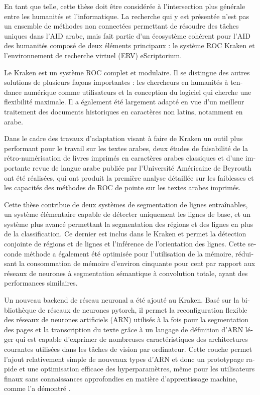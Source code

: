 \begin{french}
En tant que telle, cette thèse doit être considérée à l'intersection plus
générale entre les humanités et l'informatique. La recherche qui y est
présentée n'est pas un ensemble de méthodes non connectées permettant de
résoudre des tâches uniques dans l'AID arabe, mais fait partie d'un écosystème
cohérent pour l'AID des humanités composé de deux éléments principaux :
le système ROC Kraken et l'environnement de recherche virtuel (ERV)
eScriptorium.

Le Kraken est un système ROC complet et modulaire. Il se distingue des autres
solutions de plusieurs façons importantes : les chercheurs en humanités à
tendance numérique comme utilisateurs et la conception du logiciel qui cherche
une flexibilité maximale. Il a également été largement adapté en vue d'un
meilleur traitement des documents historiques en caractères non latins,
notamment en arabe.

Dans le cadre des travaux d'adaptation visant à faire de Kraken un outil plus
performant pour le travail sur les textes arabes, deux études de faisabilité de
la rétro-numérisation de livres imprimés en caractères arabes classiques et
d'une importante revue de langue arabe publiée par l'Université Américaine de
Beyrouth ont été réalisées, qui ont produit la première analyse détaillée sur
les faiblesses et les capacités des méthodes de ROC de pointe sur les textes
arabes imprimés.

Cette thèse contribue de deux systèmes de segmentation de lignes entraînables,
un système élémentaire capable de détecter uniquement les lignes de base, et un
système plus avancé permettant la segmentation des régions et des lignes en
plus de la classification. Ce dernier est inclus dans le Kraken et permet la
détection conjointe de régions et de lignes et l'inférence de l'orientation des
lignes. Cette seconde méthode a également été optimisée pour l'utilisation de
la mémoire, réduisant la consommation de mémoire d'environ cinquante pour cent
par rapport aux réseaux de neurones à segmentation sémantique à convolution
totale, ayant des performances similaires.

Un nouveau backend de réseau neuronal a été ajouté au Kraken. Basé sur la
bibliothèque de réseaux de neurones pytorch, il permet la reconfiguration
flexible des réseaux de neurones artificiels (ARN) utilisés à la fois pour la
segmentation des pages et la transcription du texte grâce à un langage de
définition d'ARN léger qui est capable d'exprimer de nombreuses
caractéristiques des architectures courantes utilisées dans les tâches de
vision par ordinateur. Cette couche permet l'ajout relativement simple de
nouveaux types d'ARN et donc un prototypage rapide et une optimisation efficace
des hyperparamètres, même pour les utilisateurs finaux sans connaissances
approfondies en matière d'apprentissage machine, comme l'a démontré
\cite{strobel2020much}.


\end{french}
